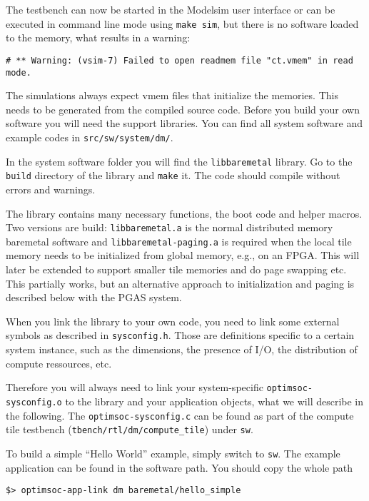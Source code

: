 \medskip
The testbench can now be started in the Modelsim user interface or can
be executed in command line mode using \verb|make sim|, but there is
no software loaded to the memory, what results in a warning:

\begin{verbatim}
# ** Warning: (vsim-7) Failed to open readmem file "ct.vmem" in read mode.
\end{verbatim}

The simulations always expect vmem files that initialize the memories.
This needs to be generated from the compiled source code. Before you
build your own software you will need the support libraries. You can
find all system software and example codes in
\verb|src/sw/system/dm/|.

In the system software folder you will find the \verb|libbaremetal|
library. Go to the \verb|build| directory of the library and
\verb|make| it. The code should compile without errors and warnings.

The library contains many necessary functions, the boot code and
helper macros. Two versions are build: \verb|libbaremetal.a| is the
normal distributed memory baremetal software and
\verb|libbaremetal-paging.a| is required when the local tile memory
needs to be initialized from global memory, e.g., on an FPGA. This
will later be extended to support smaller tile memories and do page
swapping etc. This partially works, but an alternative approach to
initialization and paging is described below with the PGAS system.

When you link the library to your own code, you need to link some
external symbols as described in \verb|sysconfig.h|. Those are
definitions specific to a certain system instance, such as the
dimensions, the presence of I/O, the distribution of compute
ressources, etc.

Therefore you will always need to link your system-specific
\verb|optimsoc-sysconfig.o| to the library and your application
objects, what we will describe in the following. The
\verb|optimsoc-sysconfig.c| can be found as part of the compute tile
testbench (\verb|tbench/rtl/dm/compute_tile|) under \verb|sw|.

To build a simple ``Hello World'' example, simply switch to \verb|sw|.
The example application can be found in the software path. You should
copy the whole path

\begin{verbatim}
$> optimsoc-app-link dm baremetal/hello_simple
\end{verbatim}

